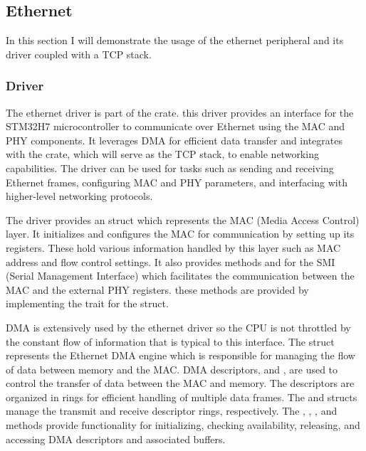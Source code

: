 \subsection{Ethernet}

In this section I will demonstrate the usage of the ethernet peripheral and its driver coupled with a TCP stack.

\subsubsection{Driver}

The ethernet driver is part of the  crate. this driver provides an interface for the STM32H7 microcontroller to communicate over Ethernet using the MAC and PHY components. It leverages DMA for efficient data transfer and integrates with the  crate, which will serve as the TCP stack, to enable networking capabilities. The driver can be used for tasks such as sending and receiving Ethernet frames, configuring MAC and PHY parameters, and interfacing with higher-level networking protocols.

The driver provides an  struct which represents the MAC (Media Access Control) layer. It initializes and configures the MAC for communication by setting up its registers. These hold various information handled by this layer such as MAC address and flow control settings. It also provides methods  and  for the SMI (Serial Management Interface) which facilitates the communication between the MAC and the external PHY registers. these methods are provided by implementing the  trait for the  struct.

DMA is extensively used by the ethernet driver so the CPU is not throttled by the constant flow of information that is typical to this interface. The  struct represents the Ethernet DMA engine which is responsible for managing the flow of data between memory and the MAC.
DMA descriptors,  and , are used to control the transfer of data between the MAC and memory. The descriptors are organized in rings for efficient handling of multiple data frames. The  and  structs manage the transmit and receive descriptor rings, respectively. The , , , and  methods provide functionality for initializing, checking availability, releasing, and accessing DMA descriptors and associated buffers.

